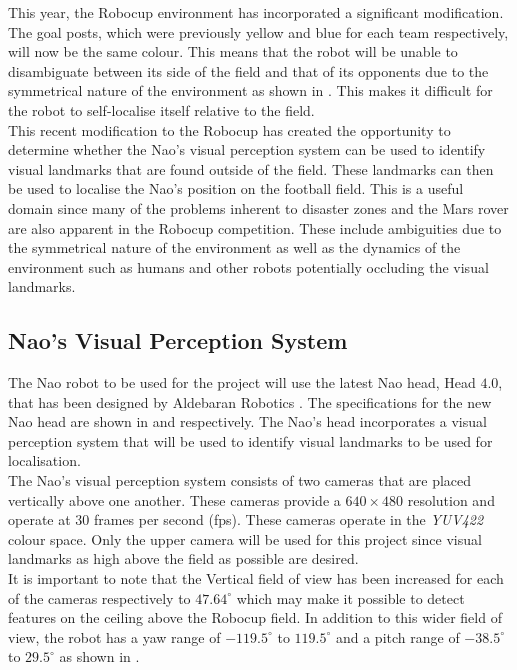 \documentclass[11pt]{report}
\begin{document}
This year, the Robocup environment has incorporated a significant modification. The goal posts, which were previously yellow and blue for each team respectively, will now be the same colour. This means that the robot will be unable to disambiguate between its side of the field and that of its opponents due to the symmetrical nature of the environment as shown in . This makes it difficult for the robot to self-localise itself relative to the field.\\

This recent modification to the Robocup has created the opportunity to determine whether the Nao's visual perception system can be used to identify visual landmarks that are found outside of the field. These landmarks can then be used to localise the Nao's position on the football field. This is a useful domain since many of the problems inherent to disaster zones and the Mars rover are also apparent in the Robocup competition. These include ambiguities due to the symmetrical nature of the environment as well as the dynamics of the environment such as humans and other robots potentially occluding the visual landmarks.\\

\subsection{Nao's Visual Perception System}
\label{sec:naoSpecs}
The Nao robot to be used for the project will use the latest Nao head, Head $4.0$, that has been designed by Aldebaran Robotics \cite{NaoHead}. The specifications for the new Nao head are shown in  and  respectively. The Nao's head incorporates a visual perception system that will be used to identify visual landmarks to be used for localisation.\\

The Nao's visual perception system consists of two cameras that are placed vertically above one another. These cameras provide a $640 \times 480$ resolution and operate at $30$ frames per second (fps). These cameras operate in the \textit{YUV422} colour space. Only the upper camera will be used for this project since visual landmarks as high above the field as possible are desired.\\

It is important to note that the Vertical field of view has been increased for each of the cameras respectively to $47.64^\circ$ which may make it possible to detect features on the ceiling above the Robocup field. In addition to this wider field of view, the robot has a yaw range of $-119.5^\circ$ to $119.5^\circ$ and a pitch range of $-38.5^\circ$ to $29.5^\circ$ as shown in .\\ 
\end{document}
